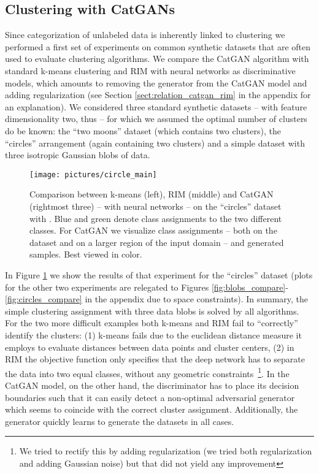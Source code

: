 \documentclass{article} \usepackage{iclr2016_conference,times}
\begin{document}
\subsection{Clustering with CatGANs}
Since categorization of unlabeled data is inherently linked to
clustering we performed a first set of experiments on common synthetic
datasets that are often used to evaluate clustering algorithms. We
compare the CatGAN algorithm with standard k-means clustering and RIM
with neural networks as discriminative models, which amounts to
removing the generator from the CatGAN model and adding 
regularization (see Section \ref{sect:relation_catgan_rim} in the
appendix for an explanation). We considered three standard synthetic
datasets -- with feature dimensionality two, thus
 -- for which we assumed the optimal number of
clusters  do be known: the ``two moons'' dataset (which contains
two clusters), the ``circles'' arrangement (again containing two
clusters) and a simple dataset with three isotropic Gaussian blobs of
data. 

\begin{figure}[t]
  \texttt{[image: pictures/circle\_main]}
  \caption{Comparison between k-means (left), RIM (middle) and CatGAN
    (rightmost three) -- with neural networks -- on the ``circles''
    dataset with . Blue and green denote class assignments to
    the two different classes. For CatGAN we visualize class
    assignments -- both on the dataset and on a larger region of the
    input domain -- and generated samples. Best viewed in color.}
  \label{fig:circles_main}
\end{figure}


In Figure \ref{fig:circles_main} we show the results of that
experiment for the ``circles'' dataset (plots for the other two
experiments are relegated to Figures
\ref{fig:blobs_compare}-\ref{fig:circles_compare} in the appendix due
to space constraints). In summary, the simple clustering assignment
with three data blobs is solved by all algorithms. For the two more
difficult examples both k-means and RIM fail to ``correctly'' identify
the clusters: (1) k-means fails due to the euclidean distance measure it
employs to evaluate distances between data points and cluster
centers, (2) in RIM the objective function only specifies that the deep
network has to separate the data into two equal classes, without any
geometric constraints~\footnote{We tried to rectify this by adding
  regularization (we tried both  regularization and adding
  Gaussian noise) but that did not yield any improvement}. In the
CatGAN model, on the other hand, the discriminator has to place its
decision boundaries such that it can easily detect a non-optimal
adversarial generator which seems to coincide with the correct cluster
assignment. Additionally, the generator quickly learns to generate the
datasets in all cases.
\end{document}
